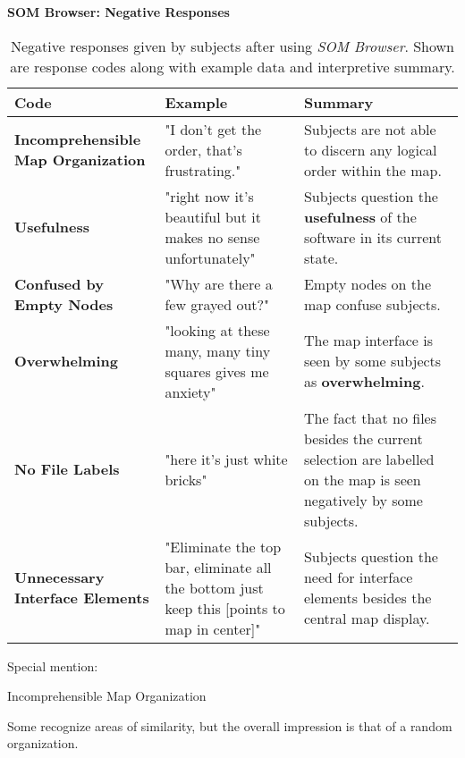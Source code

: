 \begin{table}[!ht]
  \textbf{SOM Browser: Negative Responses}
  \renewcommand{\arraystretch}{1.2}
  \centering
  \footnotesize
  \begin{tabular}{ p{4.0cm} p{4.75cm} p{4.75cm} }
  \hline
    \textbf{Code} & \textbf{Example} & \textbf{Summary} \\
    \hline
    \textbf{Incomprehensible Map Organization}
    &
    "I don't get the order, that’s frustrating."
    &
    Subjects are not able to discern any logical order within the map.
    \\
    \textbf{Usefulness}
    &
    "right now it's beautiful but it makes no sense unfortunately"
    &
    Subjects question the \textbf{usefulness} of the software in its current
    state.
    \\
    \textbf{Confused by Empty Nodes}
    &
    "Why are there a few grayed out?"
    &
    Empty nodes on the map confuse subjects.
    \\
    \textbf{Overwhelming}
    &
    "looking at these many, many tiny squares gives me anxiety"
    &
    The map interface is seen by some subjects as \textbf{overwhelming}.
    \\
    \textbf{No File Labels}
    &
    "here it’s just white bricks"
    &
    The fact that no files besides the current selection are labelled on the map
    is seen negatively by some subjects.
    \\
    \textbf{Unnecessary Interface Elements}
    &
    "Eliminate the top bar, eliminate all the bottom just keep this [points to
    map in center]"
    &
    Subjects question the need for interface elements besides the central map
    display.
    \\
  \end{tabular}
  \caption[\textit{SOM Browser}: Negative Responses]{Negative responses given
  by subjects after using \textit{SOM Browser}. Shown are response codes along
  with example data and interpretive summary.}
  \label{table:responses_som-browser_negative}
\end{table}

Special mention:

Incomprehensible Map Organization

Some recognize areas of similarity, but the overall impression is that of a
random organization.

